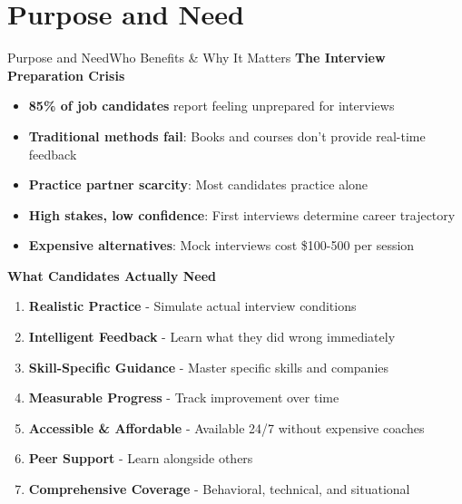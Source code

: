 \documentclass{beamer}
\begin{document}
\section{Purpose and Need}
\begin{frame}{Purpose and Need}{Who Benefits \& Why It Matters}
\textbf{The Interview Preparation Crisis}
\begin{itemize}
    \item \textbf{85\% of job candidates} report feeling unprepared for interviews
    \item \textbf{Traditional methods fail}: Books and courses don't provide real-time feedback
    \item \textbf{Practice partner scarcity}: Most candidates practice alone
    \item \textbf{High stakes, low confidence}: First interviews determine career trajectory
    \item \textbf{Expensive alternatives}: Mock interviews cost \$100-500 per session
\end{itemize}

\textbf{What Candidates Actually Need}
\begin{enumerate}
    \item \textbf{Realistic Practice} - Simulate actual interview conditions
    \item \textbf{Intelligent Feedback} - Learn what they did wrong immediately
    \item \textbf{Skill-Specific Guidance} - Master specific skills and companies
    \item \textbf{Measurable Progress} - Track improvement over time
    \item \textbf{Accessible \& Affordable} - Available 24/7 without expensive coaches
    \item \textbf{Peer Support} - Learn alongside others
    \item \textbf{Comprehensive Coverage} - Behavioral, technical, and situational
\end{enumerate}
\end{frame}

\end{document}
